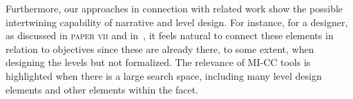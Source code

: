 Furthermore, our approaches in connection with related work show the possible intertwining capability of narrative and level design. For instance, for a designer, as discussed in \textsc{paper vii} and in~\cite{larsson_queststories_2021}, it feels natural to connect these elements in relation to objectives since these are already there, to some extent, when designing the levels but not formalized. The relevance of MI-CC tools is highlighted when there is a large search space, including many level design elements and other elements within the facet.









